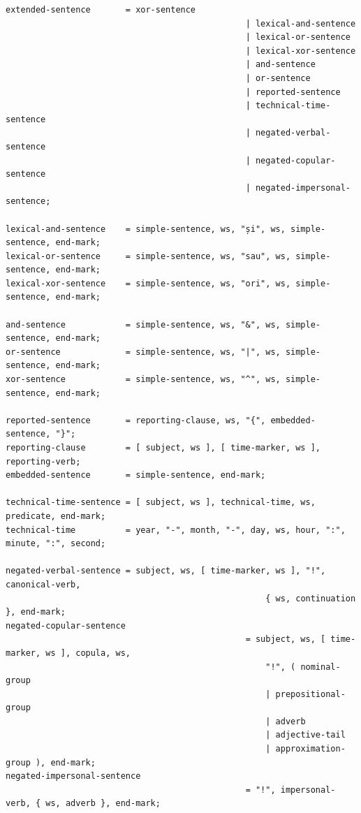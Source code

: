 \documentclass[12pt,onecolumn,letterpaper]{article}
\begin{document}
\small
\begin{verbatim}
extended-sentence       = xor-sentence
                                                | lexical-and-sentence
                                                | lexical-or-sentence
                                                | lexical-xor-sentence
                                                | and-sentence
                                                | or-sentence
                                                | reported-sentence
                                                | technical-time-sentence
                                                | negated-verbal-sentence
                                                | negated-copular-sentence
                                                | negated-impersonal-sentence;

lexical-and-sentence    = simple-sentence, ws, "și", ws, simple-sentence, end-mark;
lexical-or-sentence     = simple-sentence, ws, "sau", ws, simple-sentence, end-mark;
lexical-xor-sentence    = simple-sentence, ws, "ori", ws, simple-sentence, end-mark;

and-sentence            = simple-sentence, ws, "&", ws, simple-sentence, end-mark;
or-sentence             = simple-sentence, ws, "|", ws, simple-sentence, end-mark;
xor-sentence            = simple-sentence, ws, "^", ws, simple-sentence, end-mark;

reported-sentence       = reporting-clause, ws, "{", embedded-sentence, "}";
reporting-clause        = [ subject, ws ], [ time-marker, ws ], reporting-verb;
embedded-sentence       = simple-sentence, end-mark;

technical-time-sentence = [ subject, ws ], technical-time, ws, predicate, end-mark;
technical-time          = year, "-", month, "-", day, ws, hour, ":", minute, ":", second;

negated-verbal-sentence = subject, ws, [ time-marker, ws ], "!", canonical-verb,
                                                    { ws, continuation }, end-mark;
negated-copular-sentence
                                                = subject, ws, [ time-marker, ws ], copula, ws,
                                                    "!", ( nominal-group
                                                    | prepositional-group
                                                    | adverb
                                                    | adjective-tail
                                                    | approximation-group ), end-mark;
negated-impersonal-sentence
                                                = "!", impersonal-verb, { ws, adverb }, end-mark;


\end{verbatim}
\end{document}
